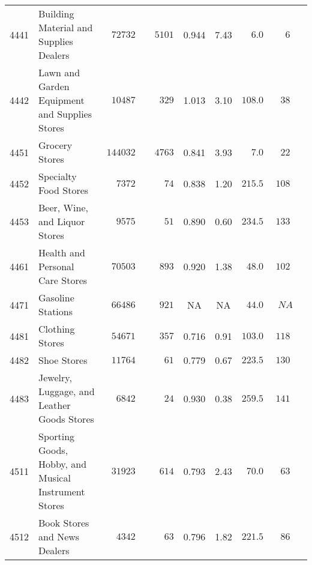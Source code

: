 \documentclass[9pt, oneside]{article}   	%
\begin{document}
\begin{longtable}{lp{3 in}ccccccc}
4441  & Building Material and Supplies Dealers & $\phantom{0}72732$ & $\phantom{00}5101$ & 0.944 &  7.43 & $\phantom{00}6.0$ & $\phantom{00}6$ \\
4442  & Lawn and Garden Equipment and Supplies Stores & $\phantom{0}10487$ & $\phantom{000}329$ & 1.013 &  3.10 & $108.0$ & $\phantom{0}38$ \\
4451  & Grocery Stores & $144032$ & $\phantom{00}4763$ & 0.841 &  3.93 & $\phantom{00}7.0$ & $\phantom{0}22$ \\
4452  & Specialty Food Stores & $\phantom{00}7372$ & $\phantom{0000}74$ & 0.838 &  1.20 & $215.5$ & $108$ \\
4453  & Beer, Wine, and Liquor Stores & $\phantom{00}9575$ & $\phantom{0000}51$ & 0.890 &  0.60 & $234.5$ & $133$ \\
4461  & Health and Personal Care Stores & $\phantom{0}70503$ & $\phantom{000}893$ & 0.920 &  1.38 & $\phantom{0}48.0$ & $102$ \\

4471  & Gasoline Stations & $\phantom{0}66486$ & $\phantom{000}921$ &    NA &    NA & $\phantom{0}44.0$ & $\phantom{0}NA$ \\
4481  & Clothing Stores & $\phantom{0}54671$ & $\phantom{000}357$ & 0.716 &  0.91 & $103.0$ & $118$ \\
4482  & Shoe Stores & $\phantom{0}11764$ & $\phantom{0000}61$ & 0.779 &  0.67 & $223.5$ & $130$ \\
4483  & Jewelry, Luggage, and Leather Goods Stores & $\phantom{00}6842$ & $\phantom{0000}24$ & 0.930 &  0.38 & $259.5$ & $141$ \\
4511  & Sporting Goods, Hobby, and Musical Instrument Stores & $\phantom{0}31923$ & $\phantom{000}614$ & 0.793 &  2.43 & $\phantom{0}70.0$ & $\phantom{0}63$ \\
4512  & Book Stores and News Dealers & $\phantom{00}4342$ & $\phantom{0000}63$ & 0.796 &  1.82 & $221.5$ & $\phantom{0}86$ \\


\end{longtable}
\end{document}
